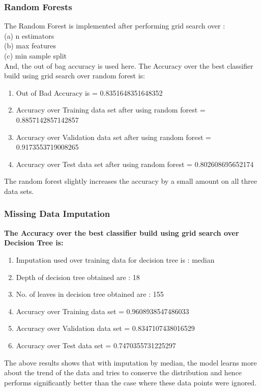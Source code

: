 \documentclass[11pt]{article}
\begin{document}
\subsubsection{Random Forests}
The Random Forest is implemented after performing grid search over :\\
(a) n estimators \\
(b) max features \\ (c) min sample split \\
And, the out of bag accuracy is used here. The Accuracy over the best classifier build using grid search over random forest is:
\begin{enumerate}
\item Out of Bad Accuracy is = 0.8351648351648352
\item Accuracy over Training data set after using random forest = 0.8857142857142857
\item Accuracy over Validation data set after using random forest = 0.9173553719008265
\item Accuracy over Test data set after using random forest = 0.802608695652174
\end{enumerate}
The random forest slightly increases the accuracy by a small amount on all three data sets.
\subsubsection{Missing Data Imputation}
\textbf{The Accuracy over the best classifier build using grid search over Decision Tree is:}
\begin{enumerate}
\item Imputation used over training data for decision tree is : median
\item Depth of decision tree obtained are : 18
\item No. of leaves in decision tree obtained are : 155
\item Accuracy over Training data set = 0.9608938547486033
\item Accuracy over Validation data set = 0.8347107438016529
\item Accuracy over Test data set = 0.7470355731225297
\end{enumerate}
The above results shows that with imputation by median, the model learns more about the trend of the data and tries to conserve the distribution and hence performs significantly better than the case where these data points
were ignored.
\vspace{3mm}
\hline
\end{document}

